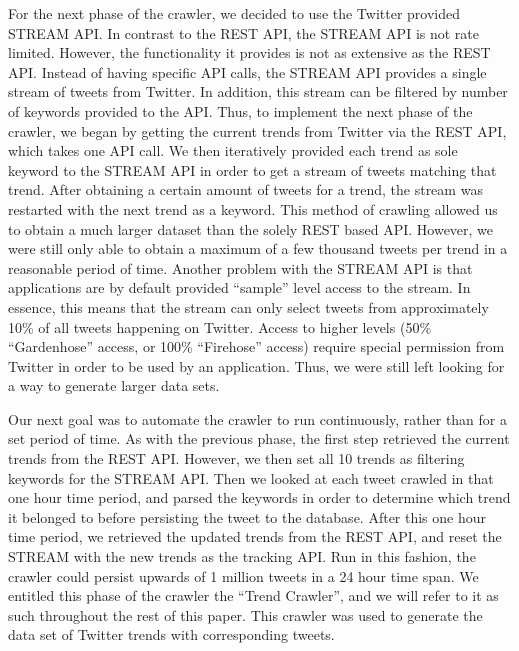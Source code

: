 \documentclass[10pt]{proc}
\begin{document}
  For the next phase of the crawler, we decided to use the Twitter provided STREAM API. In contrast to the REST API, the STREAM API\cite{Twitter_api} is not rate limited. However, the functionality it provides is not as extensive as the REST API. Instead of having specific API calls, the STREAM API provides a single stream of tweets from Twitter. In addition, this stream can be filtered by number of keywords provided to the API. Thus, to implement the next phase of the crawler, we began by getting the current trends from Twitter via the REST API, which takes one API call. We then iteratively provided each trend as sole keyword to the STREAM API in order to get a stream of tweets matching that trend. After obtaining a certain amount of tweets for a trend, the stream was restarted with the next trend as a keyword. This method of crawling allowed us to obtain a much larger dataset than the solely REST based API. However, we were still only able to obtain a maximum of a few thousand tweets per trend in a reasonable period of time. Another problem with the STREAM API is that applications are by default provided ``sample'' level access to the stream. In essence, this means that the stream can only select tweets from approximately 10\% of all tweets happening on Twitter. Access to higher levels (50\% ``Gardenhose'' access, or 100\% ``Firehose'' access) require special permission from Twitter in order to be used by an application. Thus, we were still left looking for a way to generate larger data sets.

  Our next goal was to automate the crawler to run continuously, rather than for a set period of time. As with the previous phase, the first step retrieved the current trends from the REST API. However, we then set all 10 trends as filtering keywords for the STREAM API. Then we looked at each tweet crawled in that one hour time period, and parsed the keywords in order to determine which trend it belonged to before persisting the tweet to the database. After this one hour time period, we retrieved the updated trends from the REST API, and reset the STREAM with the new trends as the tracking API. Run in this fashion, the crawler could persist upwards of 1 million tweets in a 24 hour time span. We entitled this phase of the crawler the ``Trend Crawler'', and we will refer to it as such throughout the rest of this paper. This crawler was used to generate the data set of Twitter trends with corresponding tweets.
\end{document}
